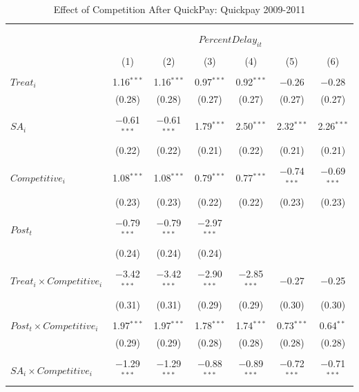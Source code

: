 \documentclass[
]{article}
\begin{document}
\begin{table}[H] \centering 
  \caption{Effect of Competition After QuickPay: Quickpay 2009-2011} 
  \label{} 
\small 
\begin{tabular}{@{\extracolsep{-3pt}}lcccccc} 
\\[-1.8ex]\hline 
\hline \\[-1.8ex] 
\\[-1.8ex] & \multicolumn{6}{c}{$PercentDelay_{it}$  } \\ 
\\[-1.8ex] & (1) & (2) & (3) & (4) & (5) & (6)\\ 
\hline \\[-1.8ex] 
 $Treat_i$ & 1.16$^{***}$ & 1.16$^{***}$ & 0.97$^{***}$ & 0.92$^{***}$ & $-$0.26 & $-$0.28 \\ 
  & (0.28) & (0.28) & (0.27) & (0.27) & (0.27) & (0.27) \\ 
  & & & & & & \\ 
 $SA_i$ & $-$0.61$^{***}$ & $-$0.61$^{***}$ & 1.79$^{***}$ & 2.50$^{***}$ & 2.32$^{***}$ & 2.26$^{***}$ \\ 
  & (0.22) & (0.22) & (0.21) & (0.22) & (0.21) & (0.21) \\ 
  & & & & & & \\ 
 $Competitive_i$ & 1.08$^{***}$ & 1.08$^{***}$ & 0.79$^{***}$ & 0.77$^{***}$ & $-$0.74$^{***}$ & $-$0.69$^{***}$ \\ 
  & (0.23) & (0.23) & (0.22) & (0.22) & (0.23) & (0.23) \\ 
  & & & & & & \\ 
 $Post_t$ & $-$0.79$^{***}$ & $-$0.79$^{***}$ & $-$2.97$^{***}$ &  &  &  \\ 
  & (0.24) & (0.24) & (0.24) &  &  &  \\ 
  & & & & & & \\ 
 $Treat_i \times Competitive_i$ & $-$3.42$^{***}$ & $-$3.42$^{***}$ & $-$2.90$^{***}$ & $-$2.85$^{***}$ & $-$0.27 & $-$0.25 \\ 
  & (0.31) & (0.31) & (0.29) & (0.29) & (0.30) & (0.30) \\ 
  & & & & & & \\ 
 $Post_t \times Competitive_i$ & 1.97$^{***}$ & 1.97$^{***}$ & 1.78$^{***}$ & 1.74$^{***}$ & 0.73$^{***}$ & 0.64$^{**}$ \\ 
  & (0.29) & (0.29) & (0.28) & (0.28) & (0.28) & (0.28) \\ 
  & & & & & & \\ 
 $SA_i \times Competitive_i$ & $-$1.29$^{***}$ & $-$1.29$^{***}$ & $-$0.88$^{***}$ & $-$0.89$^{***}$ & $-$0.72$^{***}$ & $-$0.71$^{***}$ \\ 

\end{tabular}
\end{table}
\end{document}
